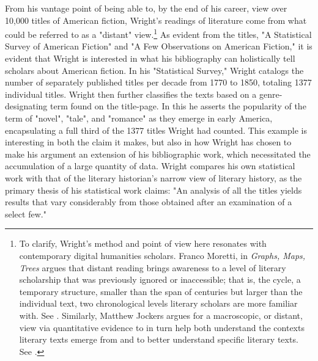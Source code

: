 From his vantage point of being able to, by the end of his career, view over 10,000 titles of American fiction, Wright's readings of literature come from what could be referred to as a "distant" view.\footnote{To clarify, Wright's method and point of view here resonates with contemporary digital humanities scholars. Franco Moretti, in \textit{Graphs, Maps, Trees} argues that distant reading brings awareness to a level of literary scholarship that was previously ignored or inaccessible; that is, the cycle, a temporary structure, smaller than the span of centuries but larger than the individual text, two chronological levels literary scholars are more familiar with. See \autocite[13-4]{moretti_graphs_2005}. Similarly, Matthew Jockers argues for a macroscopic, or distant, view via quantitative evidence to in turn help both understand the contexts literary texts emerge from and to better understand specific literary texts. See \autocite[26-7]{jockers_macroanalysis:_2013}.} As evident from the titles, "A Statistical Survey of American Fiction" and "A Few Observations on American Fiction," it is evident that Wright is interested in what his bibliography can holistically tell scholars about American fiction. In his "Statistical Survey," Wright catalogs the number of separately published titles per decade from 1770 to 1850, totaling 1377 individual titles. Wright then further classifies the texts based on a genre-designating term found on the title-page. In this he asserts the popularity of the term of "novel", "tale", and "romance" as they emerge in early America, encapsulating a full third of the 1377 titles Wright had counted.\autocite[309-11]{wright_statistical_1939} This example is interesting in both the claim it makes, but also in how Wright has chosen to make his argument an extension of his bibliographic work, which necessitated the accumulation of a large quantity of data. Wright compares his own statistical work with that of the literary historian's narrow view of literary history, as the primary thesis of his statistical work claims: "An analysis of all the titles yields results that vary considerably from those obtained after an examination of a select few."\autocite[309]{wright_statistical_1939}

